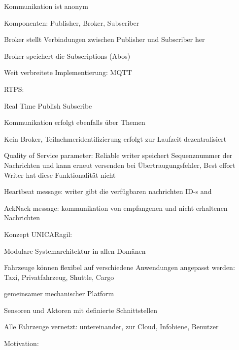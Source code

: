 \begin{notes}
\begin{notes}
\begin{notes}
                \item Kommunikation ist anonym
                \item Komponenten: Publisher, Broker, Subscriber
                \item Broker stellt Verbindungen zwischen Publisher und Subscriber her
                \item Broker speichert die Subscriptions (Abos)
                \item Weit verbreitete Implementierung: MQTT
                \item RTPS:
                \begin{notes}
                    \item Real Time Publish Subscribe
                    \item Kommunikation erfolgt ebenfalls über Themen
                    \item Kein Broker, Teilnehmeridentifizierung erfolgt zur Laufzeit dezentralisiert
                    \item Quality of Service parameter: Reliable writer speichert Sequenznummer der Nachrichten und kann erneut versenden bei Übertraugungsfehler, Best effort Writer hat diese Funktionalität nicht
                    \item Heartbeat message: writer gibt die verfügbaren nachrichten ID-s and
                    \item AckNack message: kommunikation von empfangenen und nicht erhaltenen Nachrichten
                \end{notes}
            \end{notes}
    \end{notes}
    \item Konzept UNICARagil:
        \begin{notes}
            \item Modulare Systemarchitektur in allen Domänen 
            \item Fahrzeuge können flexibel auf verschiedene Anwendungen angepasst werden: Taxi, Privatfahrzeug, Shuttle, Cargo
            \item gemeinsamer mechanischer Platform
            \item Sensoren und Aktoren mit definierte Schnittstellen
            \item Alle Fahrzeuge vernetzt: untereinander, zur Cloud, Infobiene, Benutzer 
        \end{notes}
    \item Motivation:
    \begin{notes}

\end{notes}
\end{notes}
